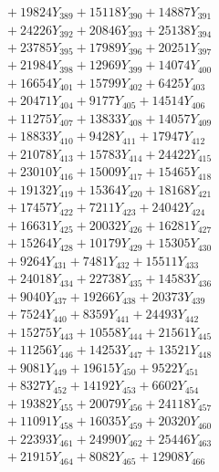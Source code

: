 \documentclass[a4paper,10pt]{article}
\begin{document}
{\begin{align}
&\;  + 19824 Y_{389} + 15118 Y_{390} + 14887 Y_{391} \\[0.3ex]
&\;  + 24226 Y_{392} + 20846 Y_{393} + 25138 Y_{394} \\[0.3ex]
&\;  + 23785 Y_{395} + 17989 Y_{396} + 20251 Y_{397} \\[0.3ex]
&\;  + 21984 Y_{398} + 12969 Y_{399} + 14074 Y_{400} \\[0.3ex]
&\;  + 16654 Y_{401} + 15799 Y_{402} + 6425 Y_{403} \\[0.3ex]
&\;  + 20471 Y_{404} + 9177 Y_{405} + 14514 Y_{406} \\[0.3ex]
&\;  + 11275 Y_{407} + 13833 Y_{408} + 14057 Y_{409} \\[0.3ex]
&\;  + 18833 Y_{410} + 9428 Y_{411} + 17947 Y_{412} \\[0.3ex]
&\;  + 21078 Y_{413} + 15783 Y_{414} + 24422 Y_{415} \\[0.3ex]
&\;  + 23010 Y_{416} + 15009 Y_{417} + 15465 Y_{418} \\[0.5ex]\allowbreak
&\;  + 19132 Y_{419} + 15364 Y_{420} + 18168 Y_{421} \\[0.3ex]
&\;  + 17457 Y_{422} + 7211 Y_{423} + 24042 Y_{424} \\[0.3ex]
&\;  + 16631 Y_{425} + 20032 Y_{426} + 16281 Y_{427} \\[0.3ex]
&\;  + 15264 Y_{428} + 10179 Y_{429} + 15305 Y_{430} \\[0.3ex]
&\;  + 9264 Y_{431} + 7481 Y_{432} + 15511 Y_{433} \\[0.3ex]
&\;  + 24018 Y_{434} + 22738 Y_{435} + 14583 Y_{436} \\[0.3ex]
&\;  + 9040 Y_{437} + 19266 Y_{438} + 20373 Y_{439} \\[0.3ex]
&\;  + 7524 Y_{440} + 8359 Y_{441} + 24493 Y_{442} \\[0.3ex]
&\;  + 15275 Y_{443} + 10558 Y_{444} + 21561 Y_{445} \\[0.3ex]
&\;  + 11256 Y_{446} + 14253 Y_{447} + 13521 Y_{448} \\[0.5ex]\allowbreak
&\;  + 9081 Y_{449} + 19615 Y_{450} + 9522 Y_{451} \\[0.3ex]
&\;  + 8327 Y_{452} + 14192 Y_{453} + 6602 Y_{454} \\[0.3ex]
&\;  + 19382 Y_{455} + 20079 Y_{456} + 24118 Y_{457} \\[0.3ex]
&\;  + 11091 Y_{458} + 16035 Y_{459} + 20320 Y_{460} \\[0.3ex]
&\;  + 22393 Y_{461} + 24990 Y_{462} + 25446 Y_{463} \\[0.3ex]
&\;  + 21915 Y_{464} + 8082 Y_{465} + 12908 Y_{466} \\[0.3ex]

\end{align}}
\end{document}
